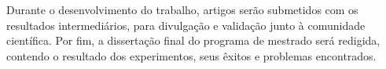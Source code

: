
Durante o desenvolvimento do trabalho, artigos serão submetidos com os resultados intermediários, para divulgação e validação junto à comunidade científica. Por fim, a dissertação final do programa de mestrado será redigida, contendo o resultado dos experimentos, seus êxitos e problemas encontrados.